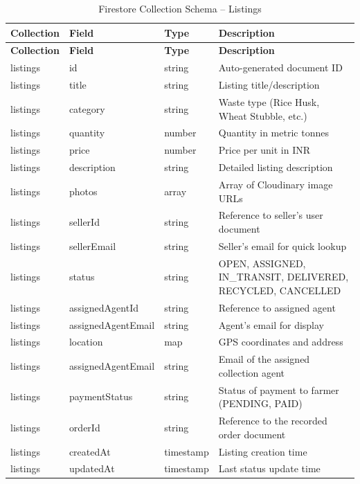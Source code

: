 \documentclass[a4paper,12pt,oneside]{report}
\begin{document}
\begin{longtable}{|p{2.5cm}|p{3cm}|p{2cm}|p{5cm}|}
\caption{Firestore Collection Schema -- Listings} \label{tab:schema-listings} \\
\hline
\textbf{Collection} & \textbf{Field} & \textbf{Type} & \textbf{Description} \\
\hline
\endfirsthead
\hline
\textbf{Collection} & \textbf{Field} & \textbf{Type} & \textbf{Description} \\
\hline
\endhead
listings & id & string & Auto-generated document ID \\
\hline
listings & title & string & Listing title/description \\
\hline
listings & category & string & Waste type (Rice Husk, Wheat Stubble, etc.) \\
\hline
listings & quantity & number & Quantity in metric tonnes \\
\hline
listings & price & number & Price per unit in INR \\
\hline
listings & description & string & Detailed listing description \\
\hline
listings & photos & array & Array of Cloudinary image URLs \\
\hline
listings & sellerId & string & Reference to seller's user document \\
\hline
listings & sellerEmail & string & Seller's email for quick lookup \\
\hline
listings & status & string & OPEN, ASSIGNED, IN\_TRANSIT, DELIVERED, RECYCLED, CANCELLED \\
\hline
listings & assignedAgentId & string & Reference to assigned agent \\
\hline
listings & assignedAgentEmail & string & Agent's email for display \\
\hline
listings & location & map & GPS coordinates and address \\
\hline
listings & assignedAgentEmail & string & Email of the assigned collection agent \\
\hline
listings & paymentStatus & string & Status of payment to farmer (PENDING, PAID) \\
\hline
listings & orderId & string & Reference to the recorded order document \\
\hline
listings & createdAt & timestamp & Listing creation time \\
\hline
listings & updatedAt & timestamp & Last status update time \\
\hline
\end{longtable}
\end{document}
